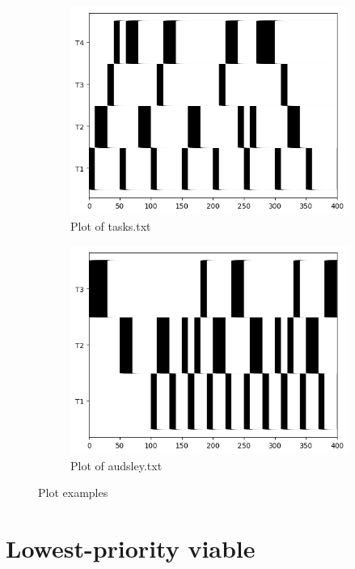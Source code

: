 \documentclass[letterpaper]{article}
\begin{document}
\begin{figure}[H]
    \begin{subfigure}{.5\textwidth}
    \centering
    \includegraphics[scale=0.5]{Images/tasks.png}
    \caption{Plot of tasks.txt}
    \end{subfigure}
    \begin{subfigure}{.5\textwidth}
    \centering
    \includegraphics[scale=0.5]{Images/audsley.png}
    \caption{Plot of audsley.txt}
    \end{subfigure}
    \caption{Plot examples}
     \label{fig:plotter}

\end{figure}

\section{Lowest-priority viable}
\end{document}
